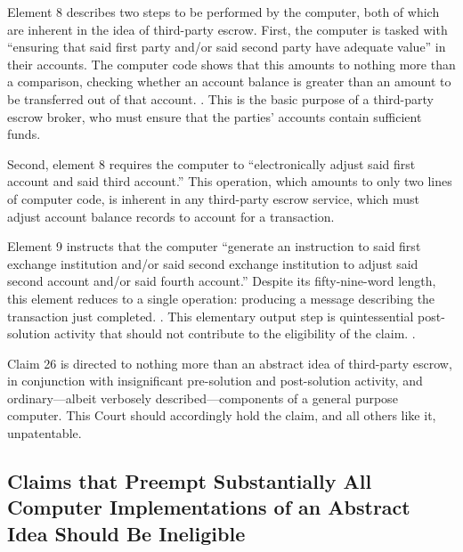 \documentclass{scotus}
\begin{document}
Element 8 describes two steps to be performed by the computer, both of which are
inherent in the idea of third-party escrow. First, the computer is tasked with
``ensuring that said first party and/or said second party have adequate value''
in their accounts. The computer code shows that this amounts to nothing more
than a comparison, checking whether an account balance is greater than an amount
to be transferred out of that account. . This is the basic purpose of a third-party escrow broker, who
must ensure that the parties' accounts contain sufficient funds.

Second, element 8 requires the computer to ``electronically adjust said first
account and said third account.'' This operation, which amounts to only two
lines of computer code,
is inherent in any third-party escrow service, which must adjust account balance
records to account for a transaction.

Element 9 instructs that the computer ``generate an instruction to said first
exchange institution and/or said second exchange institution to adjust said
second account and/or said fourth account.'' Despite its fifty-nine-word length,
this element reduces to a single operation: producing a
message describing the transaction just completed. . This elementary output step is quintessential
post-solution activity
that should not contribute to the eligibility of the claim. .

Claim 26 is directed to nothing more than an abstract idea of
third-party escrow, in conjunction with insignificant pre-solution and
post-solution activity, and ordinary---albeit verbosely described---components
of
a general purpose computer.
This Court should accordingly hold the claim, and all others like it,
unpatentable.



%
%
\subsection{Claims that Preempt Substantially All Computer Implementations of an
Abstract Idea Should Be Ineligible}

\iffalse
A patent claim with the ``practical effect'' of removing an abstract idea from
the public domain is ineligible under \inline{101}. \sentence{see benson at
71-72}.
Claim 26 of the '375 patent would have the practical effect of removing all uses
of an abstract idea \emph{implemented on a general-purpose computer} from the
public domain.
\fi
\end{document}
